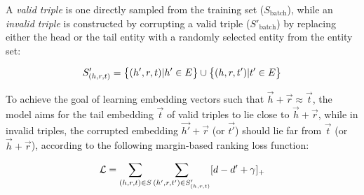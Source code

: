 A \textit{valid triple} is one directly sampled from the training set ($S_{\text{batch}}$), while an \textit{invalid triple} is constructed by corrupting a valid triple ($S'_{\text{batch}}$) by replacing either the head or the tail entity with a randomly selected entity from the entity set:

\begin{equation}
	\label{eq:sampleTransE}
	\centering
	S'_{(h, r, t)} = \big\{ (h', r, t) | h' \in E \big\} \cup \big\{ (h, r, t') | t' \in E \big\}
\end{equation}

To achieve the goal of learning embedding vectors such that $\overrightarrow{h} + \overrightarrow{r} \approx \overrightarrow{t}$, the model aims for the tail embedding $\overrightarrow{t}$ of valid triples to lie close to $\overrightarrow{h} + \overrightarrow{r}$, while in invalid triples, the corrupted embedding $\overrightarrow{h'} + \overrightarrow{r}$ (or $\overrightarrow{t'}$) should lie far from $\overrightarrow{t}$ (or $\overrightarrow{h} + \overrightarrow{r}$), according to the following margin-based ranking loss function:

\begin{equation}
	\label{eq:KBGATLoss}
	\centering
	\mathcal{L} = \sum_{(h, r, t) \in S} \sum_{(h', r, t') \in S'_{(h, r, t)}} [d - d' + \gamma]_{+}
\end{equation}


	
	
	

